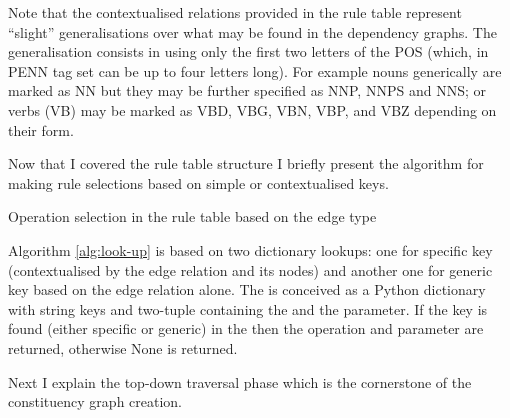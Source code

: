     Note that the contextualised relations provided in the rule table represent ``slight'' generalisations over what may be found in the dependency graphs. The generalisation consists in using only the first two letters of the POS (which, in PENN tag set can be up to four letters long). For example nouns generically are marked as NN but they may be further specified as NNP, NNPS and NNS; or verbs (VB) may be marked as VBD, VBG, VBN, VBP, and VBZ depending on their form. 

    Now that I covered the rule table structure I briefly present the algorithm for making rule selections based on simple or contextualised keys.  

    \begin{algorithm}[!ht]
        \Input{ \rt, \edge}
        \Output{ \rrule}
        \caption{Operation selection in the rule table based on the edge type}
        \label{alg:look-up}
    \end{algorithm}

    Algorithm \ref{alg:look-up} is based on two dictionary lookups: one for specific key (contextualised by the edge relation and its nodes) and another one for generic key based on the edge relation alone. The \rt is conceived as a Python dictionary with string keys and two-tuple containing the \operation and the \elementType parameter. If the key is found (either specific or generic) in the \rt then the operation and parameter are returned, otherwise None is returned. 

    Next I explain the top-down traversal phase which is the cornerstone of the constituency graph creation. 

